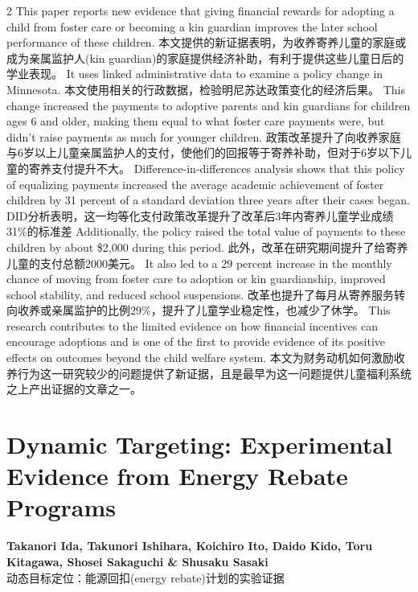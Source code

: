 \documentclass[cn,hazy,blue,14pt,screen]{elegantnote}
\begin{document}
\begin{paracol}{2}
	This paper reports new evidence that giving financial rewards for adopting a child from foster care or becoming a kin guardian improves the later school performance of these children. 
	\switchcolumn
	本文提供的新证据表明，为收养寄养儿童的家庭或成为亲属监护人(kin guardian)的家庭提供经济补助，有利于提供这些儿童日后的学业表现。
	\switchcolumn*
	It uses linked administrative data to examine a policy change in Minnesota. 
	\switchcolumn
	本文使用相关的行政数据，检验明尼苏达政策变化的经济后果。
	\switchcolumn*
	This change increased the payments to adoptive parents and kin guardians for children ages 6 and older, making them equal to what foster care payments were, but didn't raise payments as much for younger children. 
	\switchcolumn
	政策改革提升了向收养家庭与6岁以上儿童亲属监护人的支付，使他们的回报等于寄养补助，但对于6岁以下儿童的寄养支付提升不大。
	\switchcolumn*
	Difference-in-differences analysis shows that this policy of equalizing payments increased the average academic achievement of foster children by 31 percent of a standard deviation three years after their cases began. 
	\switchcolumn
	DID分析表明，这一均等化支付政策改革提升了改革后3年内寄养儿童学业成绩31\%的标准差
	\switchcolumn*
	Additionally, the policy raised the total value of payments to these children by about \$2,000 during this period. 
	\switchcolumn
	此外，改革在研究期间提升了给寄养儿童的支付总额2000美元。
	\switchcolumn*
	It also led to a 29 percent increase in the monthly chance of moving from foster care to adoption or kin guardianship, improved school stability, and reduced school suspensions. 
	\switchcolumn
	改革也提升了每月从寄养服务转向收养或亲属监护的比例29\%，提升了儿童学业稳定性，也减少了休学。
	\switchcolumn*
	This research contributes to the limited evidence on how financial incentives can encourage adoptions and is one of the first to provide evidence of its positive effects on outcomes beyond the child welfare system.
	\switchcolumn
	本文为财务动机如何激励收养行为这一研究较少的问题提供了新证据，且是最早为这一问题提供儿童福利系统之上产出证据的文章之一。
	
\end{paracol}

\section{Dynamic Targeting: Experimental Evidence from Energy Rebate Programs}
\begin{center}
	\textbf{Takanori Ida, Takunori Ishihara, Koichiro Ito, Daido Kido, Toru Kitagawa, Shosei Sakaguchi \& Shusaku Sasaki}\\
	动态目标定位：能源回扣(energy rebate)计划的实验证据
\end{center}
\end{document}
